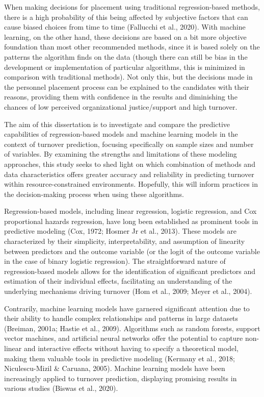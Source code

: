 \documentclass[
  jou]{apa6}
\begin{document}
When making decisions for placement using traditional regression-based methods, there is a high probability of this being affected by subjective factors that can cause biased choices from time to time (Fallucchi et al., 2020).
With machine learning, on the other hand, these decisions are based on a bit more objective foundation than most other recommended methods, since it is based solely on the patterns the algorithm finds on the data (though there can still be bias in the development or implementation of particular algorithms, this is minimized in comparison with traditional methods).
Not only this, but the decisions made in the personnel placement process can be explained to the candidates with their reasons, providing them with confidence in the results and diminishing the chances of low perceived organizational justice/support and high turnover.

The aim of this dissertation is to investigate and compare the predictive capabilities of regression-based models and machine learning models in the context of turnover prediction, focusing specifically on sample sizes and number of variables.
By examining the strengths and limitations of these modeling approaches, this study seeks to shed light on which combination of methods and data characteristics offers greater accuracy and reliability in predicting turnover within resource-constrained environments. Hopefully, this will inform practices in the decision-making process when using these algorithms.

Regression-based models, including linear regression, logistic regression, and Cox proportional hazards regression, have long been established as prominent tools in predictive modeling (Cox, 1972; Hosmer Jr et al., 2013).
These models are characterized by their simplicity, interpretability, and assumption of linearity between predictors and the outcome variable (or the logit of the outcome variable in the case of binary logistic regression).
The straightforward nature of regression-based models allows for the identification of significant predictors and estimation of their individual effects, facilitating an understanding of the underlying mechanisms driving turnover (Hom et al., 2009; Meyer et al., 2004).

Contrarily, machine learning models have garnered significant attention due to their ability to handle complex relationships and patterns in large datasets (Breiman, 2001a; Hastie et al., 2009).
Algorithms such as random forests, support vector machines, and artificial neural networks offer the potential to capture non-linear and interactive effects without having to specify a theoretical model, making them valuable tools in predictive modeling (Kermany et al., 2018; Niculescu-Mizil \& Caruana, 2005).
Machine learning models have been increasingly applied to turnover prediction, displaying promising results in various studies (Biswas et al., 2020).
\end{document}
